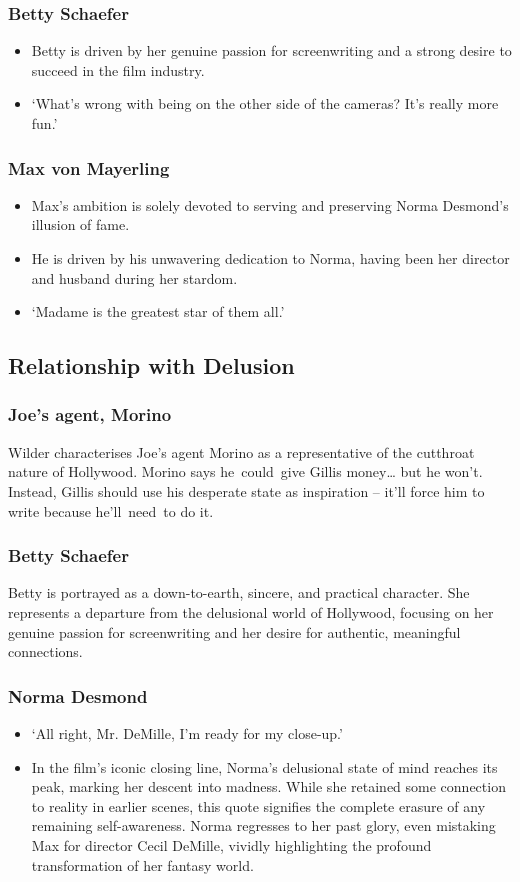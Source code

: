\documentclass[a4paper]{article}
\begin{document}
\subsubsection{Betty Schaefer}
\begin{itemize}
\item Betty is driven by her genuine passion for screenwriting and a strong desire to succeed in the film industry.
\item ‘What’s wrong with being on the other side of the cameras? It’s really more fun.’
\end{itemize}
\subsubsection{Max von Mayerling}
\begin{itemize}
\item Max’s ambition is solely devoted to serving and preserving Norma Desmond’s illusion of fame.
\item He is driven by his unwavering dedication to Norma, having been her director and husband during her stardom.
\item ‘Madame is the greatest star of them all.’
\end{itemize}
\subsection*{Relationship with Delusion}
\subsubsection{Joe’s agent, Morino}
Wilder characterises Joe’s agent Morino as a representative of the cutthroat nature of Hollywood. Morino says he could give Gillis money… but he won’t. Instead, Gillis should use his desperate state as inspiration – it’ll force him to write because he’ll need to do it.

\subsubsection{Betty Schaefer}
Betty is portrayed as a down-to-earth, sincere, and practical character. She represents a departure from the delusional world of Hollywood, focusing on her genuine passion for screenwriting and her desire for authentic, meaningful connections.

\subsubsection{Norma Desmond}
\begin{itemize}
\item ‘All right, Mr. DeMille, I’m ready for my close-up.’
\item In the film’s iconic closing line, Norma's delusional state of mind reaches its peak, marking her descent into madness. While she retained some connection to reality in earlier scenes, this quote signifies the complete erasure of any remaining self-awareness. Norma regresses to her past glory, even mistaking Max for director Cecil DeMille, vividly highlighting the profound transformation of her fantasy world.
\end{itemize}
\end{document}
